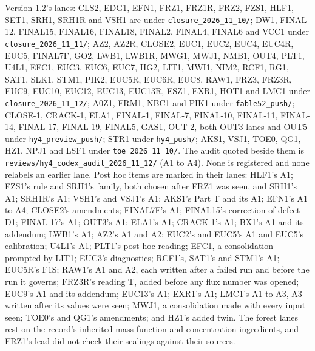 \documentclass[10pt]{article}
\begin{document}
Version 1.2's lanes: CLS2, EDG1, EFN1, FRZ1, FRZ1R, FRZ2, FZS1, HLF1, SET1, SRH1, SRH1R and VSH1 are under \texttt{closure\_2026\_11\_10/}; DW1, FINAL-12, FINAL15, FINAL16, FINAL18, FINAL2, FINAL4, FINAL6 and VCC1 under \texttt{closure\_2026\_11\_11/}; AZ2, AZ2R, CLOSE2, EUC1, EUC2, EUC4, EUC4R, EUC5, FINAL7F, GO2, LWB1, LWB1R, MWG1, MWJ1, NMB1, OUT4, PLT1, U4L1, EFC1, EUC3, EUC6, EUC7, HG2, LIT1, MWI1, NIM2, RCF1, RG1, SAT1, SLK1, STM1, PIK2, EUC5R, EUC6R, EUC8, RAW1, FRZ3, FRZ3R, EUC9, EUC10, EUC12, EUC13, EUC13R, ESZ1, EXR1, HOT1 and LMC1 under \texttt{closure\_2026\_11\_12/}; A0Z1, FRM1, NBC1 and PIK1 under \texttt{fable52\_push/}; CLOSE-1, CRACK-1, ELA1, FINAL-1, FINAL-7, FINAL-10, FINAL-11, FINAL-14, FINAL-17, FINAL-19, FINAL5, GAS1, OUT-2, both OUT3 lanes and OUT5 under \texttt{hy4\_preview\_push/}; STR1 under \texttt{hy4\_push/}; AKS1, VSJ1, TOE0, QG1, HZ1, NPJ1 and LSF1 under \texttt{toe\_2026\_11\_10/}. The audit quoted beside them is \texttt{reviews/hy4\_codex\_audit\_2026\_11\_12/} (A1 to A4). None is registered and none relabels an earlier lane. Post hoc items are marked in their lanes: HLF1's A1; FZS1's rule and SRH1's family, both chosen after FRZ1 was seen, and SRH1's A1; SRH1R's A1; VSH1's and VSJ1's A1; AKS1's Part T and its A1; EFN1's A1 to A4; CLOSE2's amendments; FINAL7F's A1; FINAL15's correction of defect D1; FINAL-17's A1; OUT3's A1; ELA1's A1; CRACK-1's A1; BX1's A1 and its addendum; LWB1's A1; AZ2's A1 and A2; EUC2's and EUC5's A1 and EUC5's calibration; U4L1's A1; PLT1's post hoc reading; EFC1, a consolidation prompted by LIT1; EUC3's diagnostics; RCF1's, SAT1's and STM1's A1; EUC5R's F1S; RAW1's A1 and A2, each written after a failed run and before the run it governs; FRZ3R's reading T, added before any flux number was opened; EUC9's A1 and its addendum; EUC13's A1; EXR1's A1; LMC1's A1 to A3, A3 written after its values were seen; MWJ1, a consolidation made with every input seen; TOE0's and QG1's amendments; and HZ1's added twin. The forest lanes rest on the record's inherited mass-function and concentration ingredients, and FRZ1's lead did not check their scalings against their sources.
\end{document}
